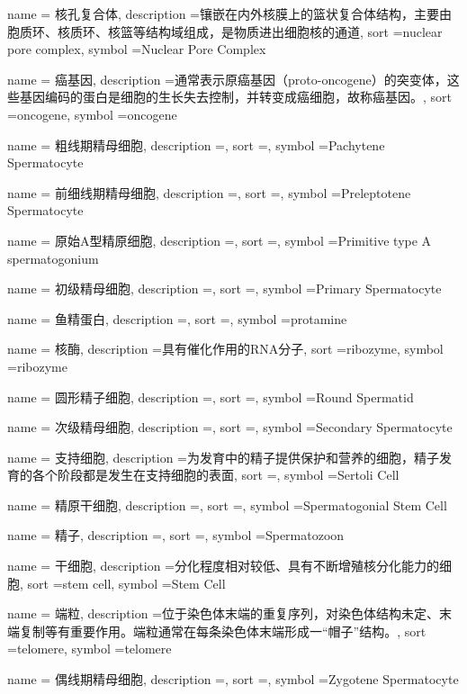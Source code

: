 {
	name = {核孔复合体},
	description ={镶嵌在内外核膜上的篮状复合体结构，主要由胞质环、核质环、核篮等结构域组成，是物质进出细胞核的通道},
	sort ={nuclear pore complex},
	symbol ={Nuclear Pore Complex}
}

{
	name = {癌基因},
	description ={通常表示原癌基因（proto-oncogene）的突变体，这些基因编码的蛋白是细胞的生长失去控制，并转变成癌细胞，故称癌基因。},
	sort ={oncogene},
	symbol ={oncogene}
}

{
	name = {粗线期精母细胞},
	description ={},
	sort ={},
	symbol ={Pachytene Spermatocyte}
}

{
	name = {前细线期精母细胞},
	description ={},
	sort ={},
	symbol ={Preleptotene Spermatocyte}
}

{
	name = {原始A型精原细胞},
	description ={},
	sort ={},
	symbol ={Primitive type A spermatogonium}
}

{
	name = {初级精母细胞},
	description ={},
	sort ={},
	symbol ={Primary Spermatocyte}
}

{
	name = {鱼精蛋白},
	description ={},
	sort ={},
	symbol ={protamine}
}

{
	name = {核酶},
	description ={具有催化作用的RNA分子},
	sort ={ribozyme},
	symbol ={ribozyme}
}

{
	name = {圆形精子细胞},
	description ={},
	sort ={},
	symbol ={Round Spermatid}
}

{
	name = {次级精母细胞},
	description ={},
	sort ={},
	symbol ={Secondary Spermatocyte}
}

{
	name = {支持细胞},
	description ={为发育中的精子提供保护和营养的细胞，精子发育的各个阶段都是发生在支持细胞的表面},
	sort ={},
	symbol ={Sertoli Cell}
}

{
	name = {精原干细胞},
	description ={},
	sort ={},
	symbol ={Spermatogonial Stem Cell}
}

{
	name = {精子},
	description ={},
	sort ={},
	symbol ={Spermatozoon}
}

{
	name = {干细胞},
	description ={分化程度相对较低、具有不断增殖核分化能力的细胞},
	sort ={stem cell},
	symbol ={Stem Cell}
}

{
	name = {端粒},
	description ={位于染色体末端的重复序列，对染色体结构未定、末端复制等有重要作用。端粒通常在每条染色体末端形成一“帽子”结构。},
	sort ={telomere},
	symbol ={telomere}
}

{
	name = {偶线期精母细胞},
	description ={},
	sort ={},
	symbol ={Zygotene Spermatocyte}
}



